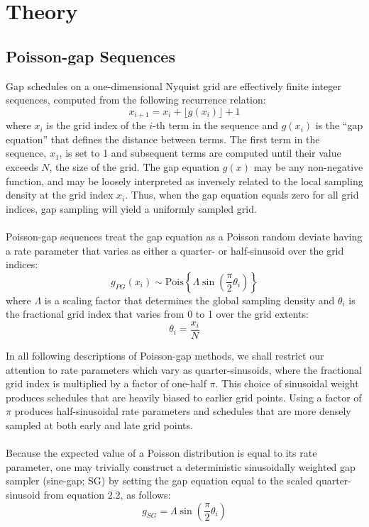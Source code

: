 \section{Theory}

\subsection{Poisson-gap Sequences}

\begin{doublespace}
Gap schedules on a one-dimensional Nyquist grid are effectively finite integer
sequences, computed from the following recurrence relation:
\begin{equation}
x_{i+1} = x_i + \lfloor g(x_i) \rfloor + 1
\end{equation}
where $x_i$ is the grid index of the $i$-th term in the sequence and $g(x_i)$
is the ``gap equation'' that defines the distance between terms. The first term
in the sequence, $x_1$, is set to 1 and subsequent terms are computed until
their value exceeds $N$, the size of the grid. The gap equation $g(x)$ may be
any non-negative function, and may be loosely interpreted as inversely related
to the local sampling density at the grid index $x_i$. Thus, when the gap
equation equals zero for all grid indices, gap sampling will yield a uniformly
sampled grid.
\\\\
Poisson-gap sequences treat the gap equation as a Poisson random deviate
having a rate parameter that varies as either a quarter- or half-sinusoid
over the grid indices:
\begin{equation}
g_{PG}(x_i) \sim \mathrm{Pois} \left\{
 \Lambda \sin \left(
  \frac{\pi}{2} \theta_i
 \right)
\right\}
\end{equation}
where $\Lambda$ is a scaling factor that determines the global sampling
density and $\theta_i$ is the fractional grid index that varies from 0 to 1
over the grid extents:
\begin{equation}
\theta_i = \frac{x_i}{N}
\end{equation}

In all following descriptions of Poisson-gap methods, we shall restrict our
attention to rate parameters which vary as quarter-sinusoids, where the
fractional grid index is multiplied by a factor of one-half $\pi$. This choice
of sinusoidal weight produces schedules that are heavily biased to earlier
grid points. Using a factor of $\pi$ produces half-sinusoidal rate parameters
and schedules that are more densely sampled at both early and late grid points.
\\\\
Because the expected value of a Poisson distribution is equal to its rate
parameter, one may trivially construct a deterministic sinusoidally weighted
gap sampler (sine-gap; SG) by setting the gap equation equal to the scaled
quarter-sinusoid from equation 2.2, as follows:
\begin{equation}
g_{SG} = \Lambda \sin \left( \frac{\pi}{2} \theta_i \right)
\end{equation}


\end{doublespace}
